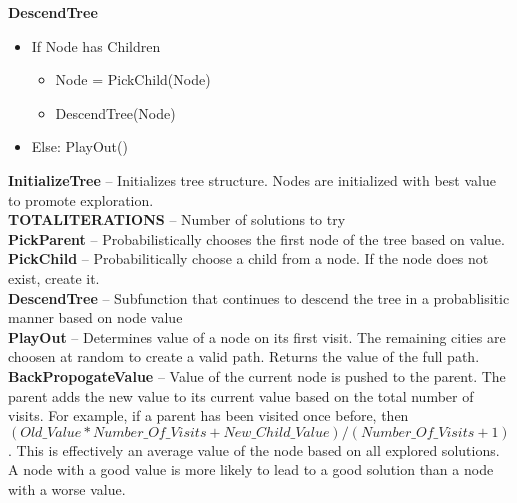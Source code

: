 \textbf{DescendTree}
\begin{itemize}
	\item If Node has Children
	\begin{itemize}
		\item Node = PickChild(Node)
		\item DescendTree(Node)
	\end{itemize}
	\item Else: PlayOut()
\end{itemize}

\textbf{InitializeTree} -- Initializes tree structure.  Nodes are initialized with best value to promote exploration. \\
\textbf{TOTALITERATIONS} -- Number of solutions to try \\
\textbf{PickParent} -- Probabilistically chooses the first node of the tree based on value. \\
\textbf{PickChild} -- Probabilitically choose a child from a node.  If the node does not exist, create it. \\
\textbf{DescendTree} -- Subfunction that continues to descend the tree in a probablisitic manner based on node value \\
\textbf{PlayOut} -- Determines value of a node on its first visit.  The remaining cities are choosen at random to create a valid path.  Returns the value of the full path. \\
\textbf{BackPropogateValue} -- Value of the current node is pushed to the parent.  The parent adds the new value to its current value based on the total number of visits.  For example, if a parent has been visited once before, then $(Old\_Value * Number\_Of\_Visits + New\_Child\_Value) / (Number\_Of\_Visits + 1)$.  This is effectively an average value of the node based on all explored solutions.  A node with a good value is more likely to lead to a good solution than a node with a worse value.